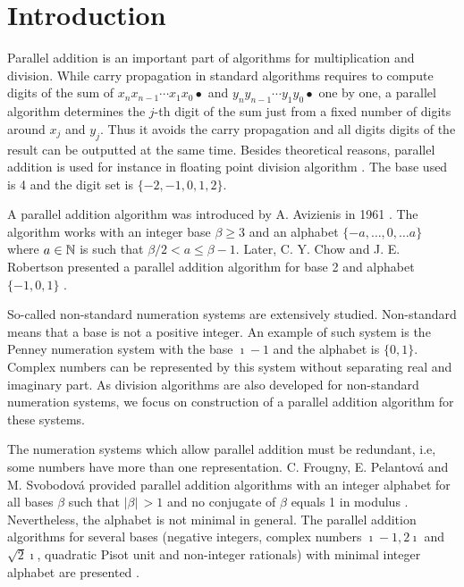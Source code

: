 \cleardoublepage{}
{}
\chapter*{Introduction}

Parallel addition  is an important part of algorithms for multiplication and division. 
While carry propagation in standard algorithms requires to compute digits of the sum of $x_n x_{n-1}\cdots x_1 x_0 \bullet$ and $y_n y_{n-1}\cdots y_1 y_0 \bullet$  one by one, a parallel algorithm determines the $j$-th digit of the sum just from a fixed number of digits around $x_j$ and $y_j$. Thus it avoids the carry propagation  and all digits digits of the result can be outputted at the same time. Besides theoretical reasons, parallel addition is used for instance in floating point division algorithm \cite{division}. The  base used is 4 and the digit set is $\{-2,-1,0,1,2\}$.

A parallel addition algorithm  was introduced by A. Avizienis in 1961 \cite{avizienis}. The algorithm works with an integer base $\beta\geq3$ and an alphabet $\{-a, \dots, 0, \dots a\}$ where $a\in\mathbb{N}$ is such that $\beta/2 <a \leq \beta-1$. Later, C. Y. Chow and J. E. Robertson presented a parallel addition algorithm for  base 2 and alphabet $\{-1,0,1\}$ \cite{chow}.

So-called non-standard numeration systems are extensively studied. Non-standard means that a base is not a positive integer. An example of such system is the Penney numeration system with the base $\imath-1$ and the alphabet is $\{0,1\}$. Complex numbers can be represented by this system without separating real and imaginary part. As division algorithms are also developed for non-standard numeration systems, we focus on construction of a parallel addition algorithm for these systems.

The numeration systems which allow parallel addition must be redundant, i.e, some numbers have more than one representation. 
C. Frougny, E. Pelantov\'a and M. Svobodov\'a provided parallel addition algorithms with an integer alphabet for all bases $\beta$ such that $|\beta|\,>\!1$ and no conjugate of $\beta$ equals 1 in modulus \cite{parAddNS}. Nevertheless, the alphabet is not minimal in general.
 The parallel addition algorithms for several bases (negative integers, complex numbers $\imath-1, 2\imath$ and $\sqrt{2}\imath$, quadratic Pisot unit and  non-integer rationals) with minimal integer alphabet are presented \cite{minAlph}.
 
